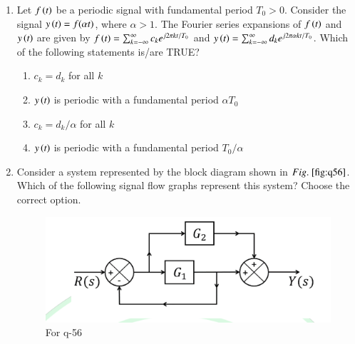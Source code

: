 \documentclass[journal,12pt,onecolumn]{IEEEtran}
\theoremstyle{remark}
\begin{document}
\begin{enumerate}
\item Let $f\left(t\right)$ be a periodic signal with fundamental period $T_0 > 0$. Consider the signal $y\left(t\right) = f(\alpha t)$, where $\alpha > 1$. The Fourier series expansions of $f\left(t\right)$ and $y\left(t\right)$ are given by
$f\left(t\right) = \sum_{k=-\infty}^{\infty} c_k e^{j2\pi k t/T_0}$ and $y\left(t\right) = \sum_{k=-\infty}^{\infty} d_k e^{j2\pi \alpha k t/T_0}$.
Which of the following statements is/are TRUE?

\hfill{}

\begin{enumerate}
\item $c_k = d_k$ for all $k$
\item $y\left(t\right)$ is periodic with a fundamental period $\alpha T_0$
\item $c_k = d_k/\alpha$ for all $k$
\item $y\left(t\right)$ is periodic with a fundamental period $T_0/\alpha$
\end{enumerate}

\item Consider a system represented by the block diagram shown in $\figref{fig:q56}$. Which of the following signal flow graphs represent this system? Choose the correct option.
\begin{figure}[H]
\centering
\includegraphics[width=0.5\columnwidth]{q56}
\caption{For q-56}
\label{fig:q56}
\end{figure}

\hfill{}


\end{enumerate}
\end{document}
